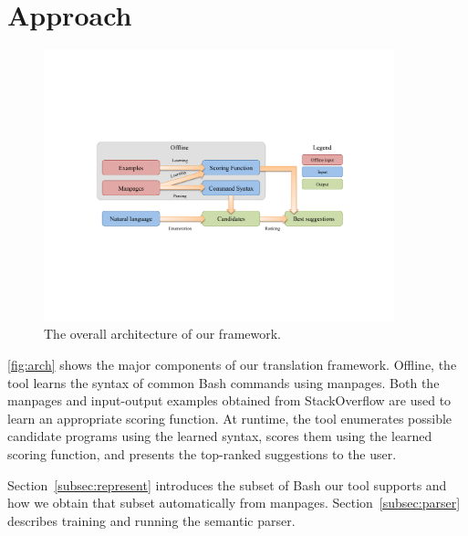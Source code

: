 \section{Approach}
\label{sec:framework}

\begin{figure}
    \begin{center} \includegraphics[width=4in]{architecture.pdf} \end{center}
    \caption{The overall architecture of our framework.}
    \label{fig:arch}
\end{figure}

\autoref{fig:arch} shows the major components of our translation framework.
Offline, the tool learns the syntax of common Bash commands using manpages. Both
the manpages and input-output examples obtained from StackOverflow are used to
learn an appropriate scoring function. At runtime, the tool enumerates possible
candidate programs using the learned syntax, scores them using the learned
scoring function, and presents the top-ranked suggestions to the user.

Section~\ref{subsec:represent} introduces the subset of Bash our tool supports
and how we obtain that subset automatically from manpages.
Section~\ref{subsec:parser} describes training and running the semantic parser.



